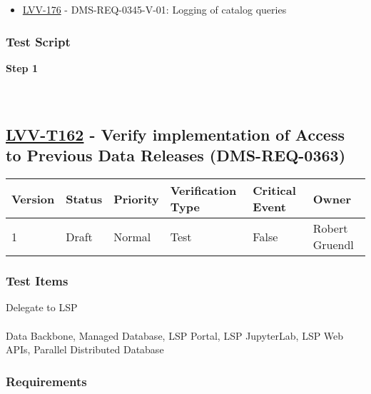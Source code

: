 \begin{itemize}
\tightlist
\item
  \href{https://jira.lsstcorp.org/browse/LVV-176}{LVV-176} -
  DMS-REQ-0345-V-01: Logging of catalog queries
\end{itemize}

\hypertarget{test-script-138}{%
\subsubsection{Test Script}\label{test-script-138}}

\textbf{Step 1}\\
~\\
~\\

\hypertarget{lvv-t162---verify-implementation-of-access-to-previous-data-releases-dms-req-0363}{%
\subsection{\texorpdfstring{\href{https://jira.lsstcorp.org/secure/Tests.jspa\#/testCase/LVV-T162}{LVV-T162}
- Verify implementation of Access to Previous Data Releases
(DMS-REQ-0363)}{LVV-T162 - Verify implementation of Access to Previous Data Releases (DMS-REQ-0363)}}\label{lvv-t162---verify-implementation-of-access-to-previous-data-releases-dms-req-0363}}

\begin{longtable}[]{@{}llllll@{}}
\toprule
Version & Status & Priority & Verification Type & Critical Event &
Owner\tabularnewline
\midrule
\endhead
1 & Draft & Normal & Test & False & Robert Gruendl\tabularnewline
\bottomrule
\end{longtable}

\hypertarget{test-items-138}{%
\subsubsection{Test Items}\label{test-items-138}}

Delegate to LSP\\
~\\
Data Backbone, Managed Database, LSP Portal, LSP JupyterLab, LSP Web
APIs, Parallel Distributed Database

\hypertarget{requirements-139}{%
\subsubsection{Requirements}\label{requirements-139}}

